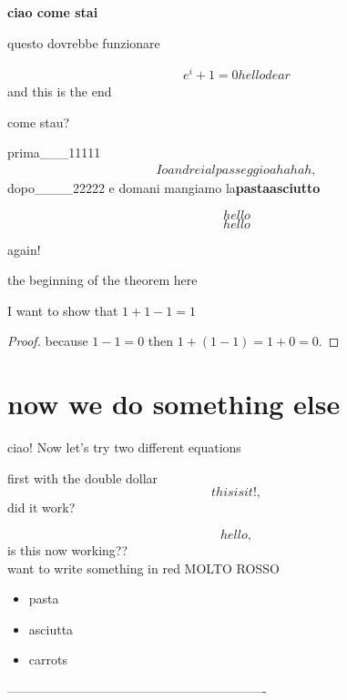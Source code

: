 

\textbf{ciao come stai}

questo dovrebbe funzionare

\begin{align*}
e^i+1=0 hello dear
\end{align*}
and this is the end

come stau?

prima___11111
\begin{align}
Io andrei al passeggio ahahah,
\end{align}
dopo____22222
e domani mangiamo la\textbf{pastaasciutto}



\begin{equation} hello \end{equation}
\begin{equation*} hello \end{equation*}

again! \centering

the beginning of the theorem {\Large here}
\begin{theorem}
I want to show that $1+1-1 = 1$
\end{theorem}
\begin{proof}
because $1-1=0$ then $1+(1-1)=1+0=0.$
\end{proof}

\section*{now we do something else}

ciao! Now let's try {\small two different equations}

first with the double dollar
$$
this is it!,
$$
did it work?

\[ hello, \] is this now working?? \\ want to write something in red {\color{red} MOLTO ROSSO }

\begin{itemize}

\item pasta
\item asciutta

\item carrots
\end{itemize}

-------------------------------------------------------------

